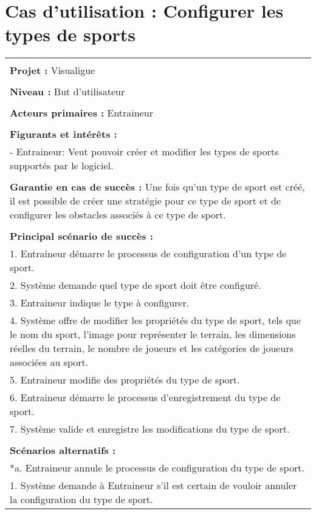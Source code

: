 \section{Cas d'utilisation : Configurer les types de sports}
\begin{longtable}{|p{16cm}|}
	\hline
	\\
	\textbf{Projet :} Visualigue\\
	\\
	\textbf{Niveau :} But d'utilisateur\\
	\\
	\textbf{Acteurs primaires :} Entraineur\\
	\\
	\textbf{Figurants et intérêts :} \\
	- Entraineur: Veut pouvoir créer et modifier les types de sports supportés par le logiciel.\\
	\\
	\textbf{Garantie en cas de succès :} Une fois qu'un type de sport est créé, il est possible de créer une stratégie pour ce type de sport et de configurer les obstacles associés à ce type de sport.\\
	\\
	\textbf{Principal scénario de succès :}\\
	1. Entraineur démarre le processus de configuration d'un  type de sport.\\
	2. Système demande quel type de sport doit être configuré.\\
	3. Entraineur indique le type à configurer.\\
	4. Système offre de modifier les propriétés du type de sport, tels que le nom du sport, l'image pour représenter le terrain, les dimensions réelles du terrain, le nombre de joueurs et les catégories de joueurs associées au sport.\\
	5. Entraineur modifie des propriétés du type de sport.\\
	6. Entraineur démarre le processus d'enregistrement du type de sport.\\
	7. Système valide et enregistre les modifications du type de sport.\\
	\\
	\textbf{Scénarios alternatifs :}\\
	*a. Entraineur annule le processus de configuration du type de sport.\\
	\hspace{1cm}1. Système demande à Entraineur s'il est certain de vouloir annuler la configuration du type de sport.\\

\end{longtable}
